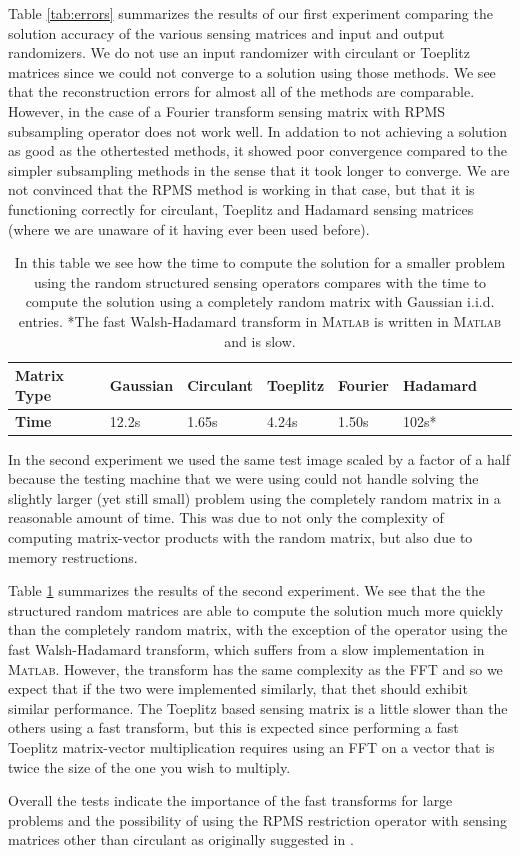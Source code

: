 Table \ref{tab:errors} summarizes the results of our first experiment comparing
the solution accuracy of the various sensing matrices and input and output
randomizers. We do not use an input randomizer with circulant or Toeplitz
matrices since we could not converge to a solution using those methods. We see
that the reconstruction errors for almost all of the methods are comparable.
However, in the case of a Fourier transform sensing matrix with RPMS
subsampling operator does not work well. In addation to not achieving a
solution as good as the othertested methods, it showed poor convergence
compared to the simpler subsampling methods in the sense that it took longer to
converge. We are not convinced that the RPMS method is working in that case,
but that it is functioning correctly for circulant, Toeplitz and Hadamard
sensing matrices (where we are unaware of it having ever been used before). 

\begin{table}[h]
  \begin{tabular}{l|lllllll} 
    \textbf{Matrix Type} & Gaussian & Circulant & Toeplitz & Fourier & Hadamard \\ \hline
    \textbf{Time}        & 12.2s    & 1.65s     & 4.24s    & 1.50s   & 102s*    \\ 
  \end{tabular}
  \label{tab:times}
  \caption{ In this table we see how the time to compute the
    solution for a smaller problem using the random structured sensing
    operators compares with the time to compute the solution using a completely
    random matrix with Gaussian i.i.d. entries. *The fast Walsh-Hadamard
    transform in \textsc{Matlab} is written in \textsc{Matlab} and is slow.}
  \end{table}

In the second experiment we used the same test image scaled by a factor of a
half because the testing machine that we were using could not handle solving
the slightly larger (yet still small) problem using the completely random
matrix in  a reasonable amount of time. This was due to not only the complexity
of computing matrix-vector products with the random matrix, but also due to
memory restructions.

Table \ref{tab:times} summarizes the results of the second experiment. We see
that the the structured random matrices are able to compute the solution much
more quickly than the completely random matrix, with the exception of the
operator using the fast Walsh-Hadamard transform, which suffers from a slow
implementation in \textsc{Matlab}. However, the transform has the same
complexity as the FFT and so we expect that if the two were implemented
similarly, that thet should exhibit similar performance.  The Toeplitz based
sensing matrix is a little slower than the others using a fast transform, but
this is expected since performing a fast Toeplitz matrix-vector multiplication
requires using an FFT on a vector that is twice the size of the one you wish to
multiply. 

Overall the tests indicate the importance of the fast transforms for large
problems and the possibility of using the RPMS restriction operator with
sensing matrices other than circulant as originally suggested in
\cite{romberg2009}.
